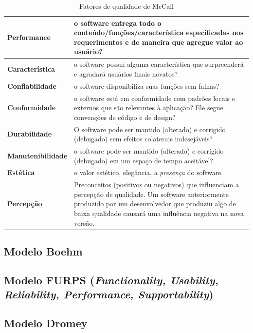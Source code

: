 \documentclass[
	12pt,				%
	openright,			%
	twoside,			%
	a4paper,			%
	english,			%
	brazil,				%
	]{abntex2}
\begin{document}
\begin{table}[H]
    \caption{Fatores de qualidade de McCall}
    \label{tab:qualidade_mccal}
    \begin{tabular}{p{3.7cm}|p{11cm}}
        \textbf{Performance} & o software entrega todo o conteúdo/funções/característica especificadas nos requerimentos e de maneira que agregue valor ao usuário? \\ \hline
        \textbf{Característica} & o software possui alguma característica que surpreenderá e agradará usuários finais novatos? \\ \hline
        \textbf{Confiabilidade} & o software disponibiliza suas funções sem falhas? \\ \hline
        \textbf{Conformidade} & o software está em conformidade com padrões locais e externos que são relevantes à aplicação? Ele segue convenções de código e de design? \\ \hline
        \textbf{Durabilidade} & O software pode ser mantido (alterado) e corrigido (debugado) sem efeitos colaterais indesejáveis? \\ \hline
        \textbf{Manutenibilidade} & o software pode ser mantido (alterado) e corrigido (debugado) em um espaço de tempo aceitável? \\ \hline
        \textbf{Estética} & o valor estético, elegância, a \emph{presença} do software.\\ \hline
        \textbf{Percepção} & Preconceitos (positivos ou negativos) que influenciam a percepção de qualidade. Um software anteriormente produzido por um desenvolvedor que produziu algo de baixa qualidade causará uma influência negativa na nova versão.\\
  \end{tabular}
\end{table}


\subsection{Modelo Boehm}


\subsection{Modelo FURPS (\emph{Functionality, Usability, Reliability, Performance,
Supportability})}


\subsection{Modelo Dromey}
\end{document}
